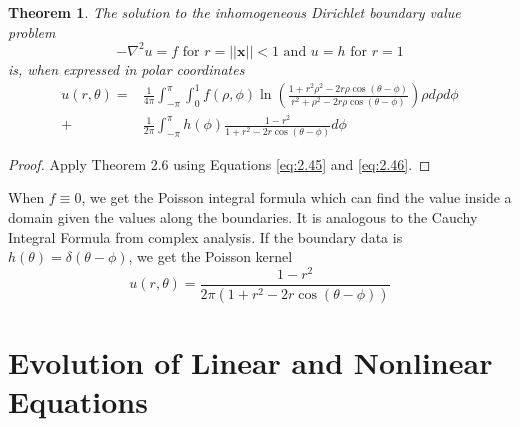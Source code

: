 \documentclass{article}
\newcommand{\vb}[1]{\mathbf{ #1}}
\newcommand{\lap}{\nabla ^2}
\newcommand{\norm}[1]{|| #1 ||}
\newtheorem{theorem}{Theorem}[section]
\numberwithin{equation}{section}
\begin{document}
\begin{theorem}
    The solution to the inhomogeneous Dirichlet boundary value problem 
    \begin{equation*}
        -\lap u = f \text{ for } r=\norm{\vb{x}} < 1 \text{ and } u=h \text{ for } r=1
    \end{equation*}
    is, when expressed in polar coordinates
    \begin{equation}
    \begin{split}
        u(r,\theta) = &\frac{1}{4\pi}\int^\pi_{-\pi}\int^1_0 f(\rho,\phi)\ln \left( \frac{1+r^2 \rho^2-2r \rho \cos (\theta-\phi)}{r^2+\rho^2-2r\rho \cos(\theta-\phi)}\right) \rho d \rho  d\phi \\
        +&\frac{1}{2\pi}\int^\pi_{-\pi} h(\phi) \frac{1-r^2}{1+r^2-2r\cos (\theta - \phi)} d\phi
    \end{split}
    \end{equation}
\end{theorem}
\begin{proof}
    Apply Theorem 2.6 using Equations \eqref{eq:2.45} and \eqref{eq:2.46}.
\end{proof}
When $f\equiv0$, we get the Poisson integral formula which can find the value inside a domain given the values along the boundaries. It is analogous to the Cauchy Integral Formula from complex analysis. If the boundary data is $h(\theta) = \delta(\theta - \phi)$, we get the Poisson kernel 
\begin{equation}
    u(r,\theta) =\frac{1-r^2}{2\pi(1+r^2-2r\cos (\theta - \phi))}
\end{equation}

\newpage






\section{Evolution of Linear and Nonlinear Equations}
\end{document}
